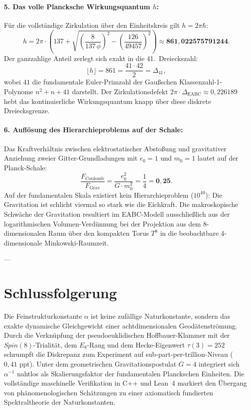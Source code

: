\documentclass[11pt,a4paper]{article}
\begin{document}
\paragraph{5. Das volle Plancksche Wirkungsquantum $h$:}
Für die vollständige Zirkulation über den Einheitskreis gilt $h = 2\pi \hbar$:
\begin{equation}
h = 2\pi \cdot \left( 137 + \sqrt{\left(\frac{8}{137\,\phi}\right)^2 - \left(\frac{126}{49457}\right)^2} \right) \approx \mathbf{861{,}022575791244}.
\end{equation}
Der ganzzahlige Anteil zerlegt sich exakt in die 41.~Dreieckszahl:
\begin{equation}
\lfloor h \rfloor = 861 = \frac{41 \cdot 42}{2} = \Delta_{41},
\end{equation}
wobei $41$ die fundamentale Euler-Primzahl der Gaußschen Klassenzahl-1-Polynome $n^2 + n + 41$ darstellt. Der Zirkulationsdefekt $2\pi \cdot \Delta_{\mathrm{EABC}} \approx 0{,}226189$ hebt das kontinuierliche Wirkungsquantum knapp über diese diskrete Dreiecksgrenze.

\paragraph{6. Auflösung des Hierarchieproblems auf der Schale:}
Das Kraftverhältnis zwischen elektrostatischer Abstoßung und gravitativer Anziehung zweier Gitter-Grundladungen mit $e_0 = 1$ und $m_0 = 1$ lautet auf der Planck-Schale:
\begin{equation}
\frac{F_{\mathrm{Coulomb}}}{F_{\mathrm{Grav}}} = \frac{e_0^2}{G \cdot m_0^2} = \frac{1}{4} = \mathbf{0{,}25}.
\end{equation}
Auf der fundamentalen Skala existiert kein Hierarchieproblem ($10^{40}$): Die Gravitation ist schlicht viermal so stark wie die Eichkraft. Die makroskopische Schwäche der Gravitation resultiert im EABC-Modell ausschließlich aus der logarithmischen Volumen-Verdünnung bei der Projektion aus dem 8-dimensionalen Raum über den kompakten Torus $T^8$ in die beobachtbare 4-dimensionale Minkowski-Raumzeit.

---

\section{Schlussfolgerung}

Die Feinstrukturkonstante $\alpha$ ist keine zufällige Naturkonstante, sondern das exakte dynamische Gleichgewicht einer achtdimensionalen Geodätenströmung. Durch die Verknüpfung der pseudoeuklidischen Hoffbauer-Klammer mit der $Spin(8)$-Trialität, dem $E_8$-Rang und dem Hecke-Eigenwert $\tau(3) = 252$ schrumpft die Diskrepanz zum Experiment auf sub-part-per-trillion-Niveau ($0{,}41\text{ ppt}$). 
Unter dem geometrischen Gravitationspostulat $G = 4$ integriert sich $\alpha^{-1}$ nahtlos als Skalierungsfaktor der fundamentalen Planckschen Einheiten. Die vollständige maschinelle Verifikation in C++ und Lean~4 markiert den Übergang von phänomenologischen Schätzungen zu einer axiomatisch fundierten Spektraltheorie der Naturkonstanten.
\end{document}
